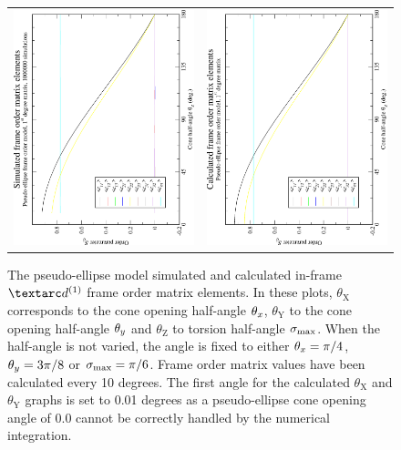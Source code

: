 \begin{figure}
\begin{tabular}{@{}cc@{}}
    \\[-5pt]
    \includegraphics[width=.35\textwidth,angle=270]{images/frame_order_matrix/Sij_pseudo-ellipse_in_frame_theta_z_ens1000000.eps} &
    \includegraphics[width=.35\textwidth,angle=270]{images/frame_order_matrix/Sij_pseudo-ellipse_in_frame_theta_z_calc.eps} \\
  \end{tabular}
  \caption[Pseudo-ellipse simulated and calculated in-frame Daeg$^{(1)}$ elements.]{
    The pseudo-ellipse model simulated and calculated in-frame $\FOone$ frame order matrix elements.
    In these plots, $\theta_\textrm{X}$ corresponds to the cone opening half-angle $\theta_x$, $\theta_\textrm{Y}$ to the cone opening half-angle $\theta_y$ and $\theta_\textrm{Z}$ to torsion half-angle $\sigma_\textrm{max}$.
    When the half-angle is not varied, the angle is fixed to either $\theta_x = \pi/4$, $\theta_y = 3\pi/8$ or $\sigma_\textrm{max} = \pi/6$.
    Frame order matrix values have been calculated every 10 degrees.
    The first angle for the calculated $\theta_\textrm{X}$ and $\theta_\textrm{Y}$ graphs is set to 0.01 degrees as a pseudo-ellipse cone opening angle of 0.0 cannot be correctly handled by the numerical integration.
  }
  \label{fig: simulated and calculated in-frame 1st degree pseudo-ellipse frame order}
\end{figure}

